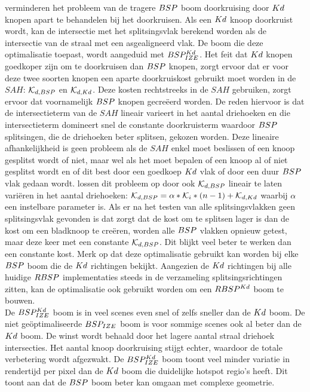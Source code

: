    \authorIze{} \cite{ize} verminderen het probleem van de tragere $BSP$ boom doorkruising door $Kd$ knopen apart te behandelen bij het doorkruisen. 
    Als een $Kd$ knoop doorkruist wordt, kan de intersectie met het splitsingsvlak berekend worden als de intersectie van de straal met een asgealigneerd vlak. 
    De boom die deze optimalisatie toepast, wordt aangeduid met $BSP^{Kd}_{IZE}$.
    Het feit dat $Kd$ knopen goedkoper zijn om te doorkruisen dan $BSP$ knopen, zorgt ervoor dat er voor deze twee soorten knopen een aparte doorkruiskost gebruikt moet worden in de $SAH$: $\mathcal{K}_{d,BSP}$ en $\mathcal{K}_{d,Kd}$.
    Deze kosten rechtstreeks in de $SAH$ gebruiken, zorgt ervoor dat voornamelijk $BSP$ knopen gecreëerd worden.
    De reden hiervoor is dat de intersectieterm van de $SAH$ lineair varieert in het aantal driehoeken en die intersectieterm domineert snel de constante doorkruisterm waardoor $BSP$ splitsingen, die de driehoeken beter splitsen, gekozen worden.
    Deze lineaire afhankelijkheid is geen probleem als de $SAH$ enkel moet beslissen of een knoop gesplitst wordt of niet, maar wel als het moet bepalen of een knoop al of niet gesplitst wordt en of dit best door een goedkoep $Kd$ vlak of door een duur $BSP$ vlak gedaan wordt.
    \authorIze{} \cite{ize} lossen dit probleem op door ook $\mathcal{K}_{d,BSP}$ lineair te laten variëren in het aantal driehoeken: $\mathcal{K}_{d,BSP} = \alpha * \mathcal{K}_i * (n - 1) + \mathcal{K}_{d,Kd}$ waarbij $\alpha$ een instelbare parameter is.
    Als er na het testen van alle splitsingsvlakken geen splitsingsvlak gevonden is dat zorgt dat de kost om te splitsen lager is dan de kost om een bladknoop te creëren, worden alle $BSP$ vlakken opnieuw getest, maar deze keer met een constante $\mathcal{K}_{d,BSP}$. Dit blijkt veel beter te werken dan een constante kost. Merk op dat deze optimalisatie gebruikt kan worden bij elke $BSP$ boom die de $Kd$ richtingen bekijkt. Aangezien de $Kd$ richtingen bij alle huidige $RBSP$ implementaties steeds in de verzameling splitsingsrichtingen zitten, kan de optimalisatie ook gebruikt worden om een $RBSP^{Kd}$ boom te bouwen.\\
    
    De $BSP^{Kd}_{IZE}$ boom is in veel scenes even snel of zelfs sneller dan de $Kd$ boom.
    De niet geöptimaliseerde $BSP_{IZE}$ boom is voor sommige scenes ook al beter dan de $Kd$ boom. 
    De winst wordt behaald door het lagere aantal straal driehoek intersecties.
    Het aantal knoop doorkruising stijgt echter, waardoor de totale verbetering wordt afgezwakt. De $BSP^{Kd}_{IZE}$ boom toont veel minder variatie in rendertijd per pixel dan de $Kd$ boom die duidelijke hotspot regio's heeft. Dit toont aan dat de $BSP$ boom beter kan omgaan met complexe geometrie.

